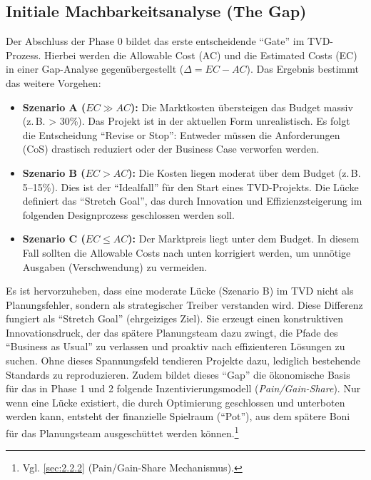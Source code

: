 \subsection{Initiale Machbarkeitsanalyse (The Gap)}
\label{sec:4.2.3}
Der Abschluss der Phase 0 bildet das erste entscheidende \enquote{Gate} im \acs{TVD}-Prozess. Hierbei werden die Allowable Cost (AC) und die Estimated Costs (EC) in einer Gap-Analyse gegenübergestellt ($\Delta = EC - AC$). Das Ergebnis bestimmt das weitere Vorgehen:\autocite[Vgl.][S.~14 f]{ballard_target_2025}

\begin{itemize}
    \item \textbf{Szenario A ($EC \gg AC$):} Die Marktkosten übersteigen das Budget massiv (z.\,B. > 30\%). Das Projekt ist in der aktuellen Form unrealistisch. Es folgt die Entscheidung \enquote{Revise or Stop}: Entweder müssen die Anforderungen (\acs{CoS}) drastisch reduziert oder der Business Case verworfen werden.
    \item \textbf{Szenario B ($EC > AC$):} Die Kosten liegen moderat über dem Budget (z.\,B. 5--15\%). Dies ist der \enquote{Idealfall} für den Start eines \acs{TVD}-Projekts. Die Lücke definiert das \enquote{Stretch Goal}, das durch Innovation und Effizienzsteigerung im folgenden Designprozess geschlossen werden soll.
    \item \textbf{Szenario C ($EC \leq AC$):} Der Marktpreis liegt unter dem Budget. In diesem Fall sollten die Allowable Costs nach unten korrigiert werden, um unnötige Ausgaben (Verschwendung) zu vermeiden.
\end{itemize}

Es ist hervorzuheben, dass eine moderate Lücke (Szenario B) im \acs{TVD} nicht als Planungsfehler, sondern als strategischer Treiber verstanden wird. Diese Differenz fungiert als \enquote{Stretch Goal} (ehrgeiziges Ziel). Sie erzeugt einen konstruktiven Innovationsdruck, der das spätere Planungsteam dazu zwingt, die Pfade des \enquote{Business as Usual} zu verlassen und proaktiv nach effizienteren Lösungen zu suchen. Ohne dieses Spannungsfeld tendieren Projekte dazu, lediglich bestehende Standards zu reproduzieren.\autocite[Vgl.][S.~108 f]{ballard_target_2025}
Zudem bildet dieses \enquote{Gap} die ökonomische Basis für das in Phase 1 und 2 folgende Inzentivierungsmodell (\textit{Pain/Gain-Share}). Nur wenn eine Lücke existiert, die durch Optimierung geschlossen und unterboten werden kann, entsteht der finanzielle Spielraum (\enquote{Pot}), aus dem spätere Boni für das Planungsteam ausgeschüttet werden können.\footnote{Vgl. \cref{sec:2.2.2} (Pain/Gain-Share Mechanismus).}

